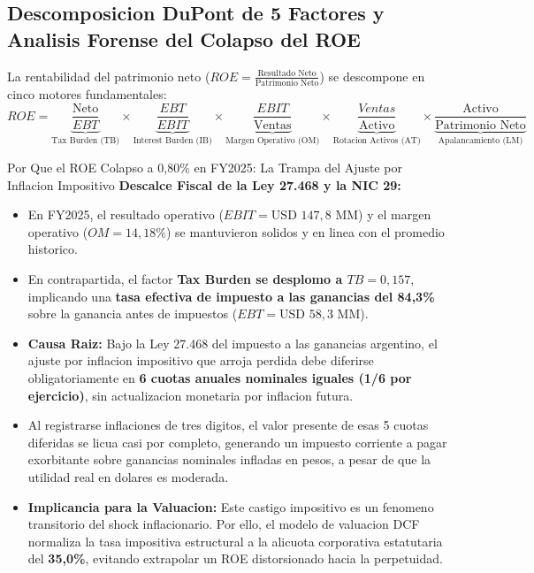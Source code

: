 \documentclass[10pt,a4paper]{article}
\theoremstyle{definition}
\begin{document}
\subsection{Descomposicion DuPont de 5 Factores y Analisis Forense del Colapso del ROE}
La rentabilidad del patrimonio neto ($ROE = \frac{\text{Resultado Neto}}{\text{Patrimonio Neto}}$) se descompone en cinco motores fundamentales:
\begin{equation}
ROE = \underbrace{\frac{\text{Neto}}{EBT}}_{\text{Tax Burden (TB)}} \times \underbrace{\frac{EBT}{EBIT}}_{\text{Interest Burden (IB)}} \times \underbrace{\frac{EBIT}{\text{Ventas}}}_{\text{Margen Operativo (OM)}} \times \underbrace{\frac{Ventas}{\text{Activo}}}_{\text{Rotacion Activos (AT)}} \times \underbrace{\frac{\text{Activo}}{\text{Patrimonio Neto}}}_{\text{Apalancamiento (LM)}}
\end{equation}

\begin{conceptbox}{Por Que el ROE Colapso a 0,80\% en FY2025: La Trampa del Ajuste por Inflacion Impositivo}
\textbf{Descalce Fiscal de la Ley 27.468 y la NIC 29:}
\begin{itemize}
    \item En FY2025, el resultado operativo ($EBIT = \text{USD } 147,8\text{ MM}$) y el margen operativo ($OM = 14,18\%$) se mantuvieron solidos y en linea con el promedio historico.
    \item En contrapartida, el factor \textbf{Tax Burden se desplomo a $TB = 0,157$}, implicando una \textbf{tasa efectiva de impuesto a las ganancias del 84,3\%} sobre la ganancia antes de impuestos ($EBT = \text{USD } 58,3\text{ MM}$).
    \item \textbf{Causa Raiz:} Bajo la Ley 27.468 del impuesto a las ganancias argentino, el ajuste por inflacion impositivo que arroja perdida debe diferirse obligatoriamente en \textbf{6 cuotas anuales nominales iguales (1/6 por ejercicio)}, sin actualizacion monetaria por inflacion futura.
    \item Al registrarse inflaciones de tres digitos, el valor presente de esas 5 cuotas diferidas se licua casi por completo, generando un impuesto corriente a pagar exorbitante sobre ganancias nominales infladas en pesos, a pesar de que la utilidad real en dolares es moderada.
    \item \textbf{Implicancia para la Valuacion:} Este castigo impositivo es un fenomeno transitorio del shock inflacionario. Por ello, el modelo de valuacion DCF normaliza la tasa impositiva estructural a la alicuota corporativa estatutaria del \textbf{35,0\%}, evitando extrapolar un ROE distorsionado hacia la perpetuidad.
\end{itemize}
\end{conceptbox}
\end{document}
